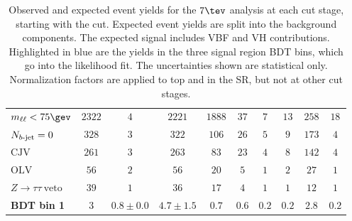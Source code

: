 \begin{table}[h]
\begin{center}
{\begin{tabular}{l || c c c | c c c c c c }
$\mll < 75 \gev$ & $2322$ & $4$ & $2221$ & $1888$ & $37$ & $7$ & $13$
& $258$ & $18$ \\
$N_{b\textrm{-jet}} = 0$ & $328$ & $3$ & $322$ & $106$ & $26$ & $5$ & $9$ & $173$
& $4$ \\
$\textrm{CJV}$ & $261$ & $3$ & $263$ & $83$ & $23$ & $4$ & $8$ & $142$
& $4$ \\
$\textrm{OLV}$ & $56$ & $2$ & $56$ & $20$ & $5$ & $1$ & $2$ & $27$ &
$1$ \\
$Z\rightarrow{\tau\tau}~\textrm{veto}$ & $39$ & $1$ & $36$ & $17$ &
$4$ & $1$ & $1$ & $12$ & $1$ \\
\hline
{\bf\color{blue} BDT bin 1} & $3$ & $0.8 \pm 0.0$ & $4.7 \pm 1.5$ & $0.7$ &
$0.6$ & $0.2$ & $0.2$ & $2.8$ & $0.2$ \\
\hline
\end{tabular}
}
\caption[]{Observed and expected event yields for the $7 \tev$
analysis at each cut stage,
starting with the \Njet cut. Expected event yields are split into the
background components. The expected signal includes VBF and VH
contributions. Highlighted in {\color{blue}blue} are the yields in the
three signal region BDT bins, which go into the likelihood fit. The uncertainties
shown are statistical only. Normalization factors are applied to top
and \ZDY in the SR, but not at other cut stages.}
\label{chap:analysis:tab:signal_region_cutflow_2011}
\end{center}
\end{table}



